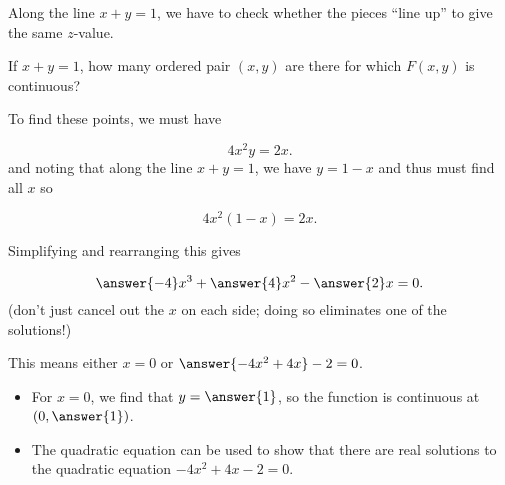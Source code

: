 \documentclass{ximera}
\begin{document}
\begin{exercise}
\begin{exercise}
\begin{feedback}[correct]
Along the line $x+y=1$, we have to check whether the pieces ``line up'' to give the same $z$-value.
\end{feedback}
\begin{exercise}
If $x+y=1$, how many ordered pair $(x,y)$ are there for which $F(x,y)$ is continuous?

\begin{multipleChoice}
\end{multipleChoice}

To find these points, we must have 

\[
4x^2y=2x.
\]
and noting that along the line $x+y=1$, we have $y=1-x$ and thus must find all $x$ so

\[
4x^2(1-x)=2x.
\]

Simplifying and rearranging this gives

\[
\answer{-4}x^3+\answer{4}x^2-\answer{2}x = 0.
\]
(don't just cancel out the $x$ on each side; doing so eliminates one of the solutions!)

This means either $x=0$ or $\answer{-4x^2+4x}-2=0$. 

\begin{itemize}
\item For $x=0$, we find that $y=\answer{1}$, so the function is continuous at $\left(0,\answer{1}\right)$.
\item The quadratic equation can be used to show that there are  real solutions to the quadratic equation $-4x^2+4x-2=0$.
\end{itemize}

\end{exercise}
\end{exercise}
 \end{exercise}
\end{document}

